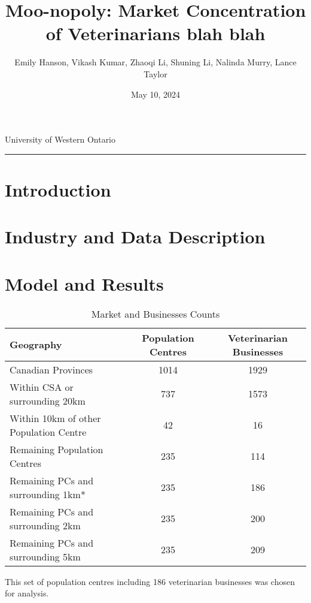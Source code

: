 \documentclass[a4paper,11pt]{article}
\title{\vspace{-1.2cm} Moo-nopoly: Market Concentration of Veterinarians blah blah}
\author{Emily Hanson, Vikash Kumar, Zhaoqi Li, Shuning Li, Nalinda Murry, Lance Taylor }
\date{May 10, 2024}
\begin{document}
\maketitle \vspace{-.4 in}
\begin{center}
University of Western Ontario
\rule{\textwidth}{1pt} 
\end{center}




\begin{abstract}
\lipsum[5]
\end{abstract}

\section{Introduction}

\section{Industry and Data Description}

\section{Model and Results}


\begin{table}[h]  
\begin{threeparttable}
\caption{Market and Businesses Counts} %
\centering %
\begin{tabular}{l c c } %
\hline\hline   
 Geography & Population Centres & Veterinarian Businesses   
\\ [0.5ex]  
\hline   
Canadian Provinces & 1014 & 1929 \\
Within CSA or surrounding 20km & 737 & 1573 \\
Within 10km of other Population Centre & 42 & 16 \\
Remaining Population Centres & 235 & 114 \\

Remaining PCs and surrounding 1km* & 235 & 186 \\

Remaining PCs and surrounding 2km  & 235 & 200 \\

Remaining PCs and surrounding 5km  & 235 & 209 \\

\hline %
\end{tabular}  
\begin{tablenotes}
    \small  *This set of population centres including 186 veterinarian businesses was chosen for analysis. 
\end{tablenotes}
\end{threeparttable}
\end{table}  
\end{document}
